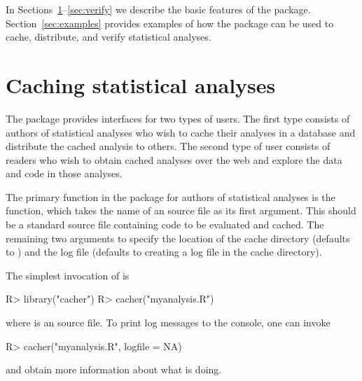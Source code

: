 \documentclass[nojss]{jss}
\begin{document}
In Sections~\ref{sec:cacher}--\ref{sec:verify} we describe the basic
features of the  package.  Section~\ref{sec:examples}
provides examples of how the  package can be used to
cache, distribute, and verify statistical analyses.


\section{Caching statistical analyses}
\label{sec:cacher}

The  package provides interfaces for two types of users.
The first type consists of authors of statistical analyses who wish to
cache their analyses in a database and distribute the cached analysis
to others.  The second type of user consists of readers who wish to
obtain cached analyses over the web and explore the data and code in
those analyses.

The primary function in the  package for authors of
statistical analyses is the  function, which takes the
name of an  source file as its first argument.  This
should be a standard source file containing  code to be
evaluated and cached.  The remaining two arguments to 
specify the location of the cache directory (defaults to
) and the log file (defaults to creating a log file in
the cache directory).

The simplest invocation of  is
\begin{Schunk}
\begin{Sinput}
R> library("cacher")
R> cacher("myanalysis.R")
\end{Sinput}
\end{Schunk}
where  is an  source file.  To print
log messages to the console, one can invoke
\begin{Schunk}
\begin{Sinput}
R> cacher("myanalysis.R", logfile = NA)
\end{Sinput}
\end{Schunk}
and obtain more information about what  is doing.
\end{document}
